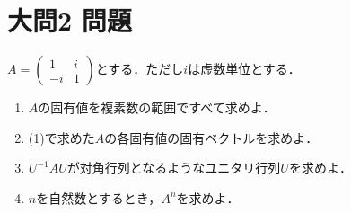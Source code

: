 \documentclass[dvipdfmx]{jsreport}
\begin{document}
\section{大問2 問題}
\begin{tcolorbox} %
	$A= \begin{pmatrix}1& i\\ {-i}& 1\end{pmatrix}$とする．ただし$i$は虚数単位とする．
\begin{enumerate}
	\item $A$の固有値を複素数の範囲ですべて求めよ．
	\item (1)で求めた$A$の各固有値の固有ベクトルを求めよ．
	\item $U^{-1}AU$が対角行列となるようなユニタリ行列$U$を求めよ．
	\item $n$を自然数とするとき，$A^n$を求めよ．
\end{enumerate}
\end{tcolorbox}
\end{document}
